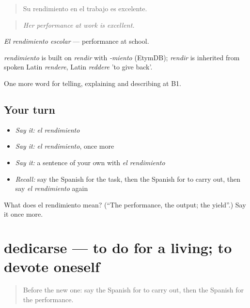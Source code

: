 \begin{quote}
Su rendimiento en el trabajo es excelente.
\end{quote}

\begin{quote}
\emph{Her performance at work is excellent.}
\end{quote}

\emph{El rendimiento escolar} — performance at school.

\begin{cousinweb}
\emph{rendimiento} is built on \emph{rendir} with \emph{-miento} (EtymDB); \emph{rendir} is inherited from spoken Latin \emph{rendere}, Latin \emph{reddere} 'to give back'.
\end{cousinweb}

\begin{grammarlens}[title={What you've built}]
One more word for telling, explaining and describing at B1.
\end{grammarlens}

\subsection*{Your turn}
\begin{itemize}
\raggedright
  \item \emph{Say it:} \emph{el rendimiento}
  \item \emph{Say it:} \emph{el rendimiento}, once more
  \item \emph{Say it:} a sentence of your own with \emph{el rendimiento}
  \item \emph{Recall:} say the Spanish for the task, then the Spanish for to carry out, then say \emph{el rendimiento} again
\end{itemize}

\begin{tcolorbox}[breakable,colback=teal!4,colframe=teal!35!black,title={Before you move on}]
What does el rendimiento mean? (\textquotedblleft{}The performance, the output; the yield\textquotedblright{}.) Say it once more.
\end{tcolorbox}
\section[dedicarse]{dedicarse — to do for a living; to devote oneself}

\label{lesson:ES-C593-dedicarse}



\begin{quote}
Before the new one: say the Spanish for to carry out, then the Spanish for the performance.
\end{quote}

